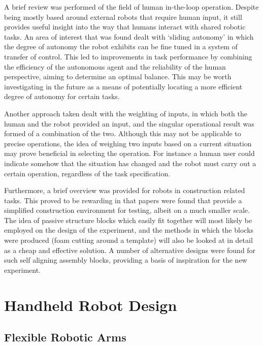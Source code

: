 \documentclass[11pt]{article}
\begin{document}
A brief review was performed of the field of human in-the-loop operation. Despite being mostly based around external robots that require human input, it still provides useful insight into the way that humans interact with shared robotic tasks. An area of interest that was found dealt with `sliding autonomy' in which the degree of autonomy the robot exhibits can be fine tuned in a system of transfer of control. This led to improvements in task performance by combining the efficiency of the autonomous agent and the reliability of the human perspective, aiming to determine an optimal balance. This may be worth investigating in the future as a means of potentially locating a more efficient degree of autonomy for certain tasks. 

Another approach taken dealt with the weighting of inputs, in which both the human and the robot provided an input, and the singular operational result was formed of a combination of the two. Although this may not be applicable to precise operations, the idea of weighing two inputs based on a current situation may prove beneficial in selecting the operation. For instance a human user could indicate somehow that the situation has changed and the robot must carry out a certain operation, regardless of the task specification.

Furthermore, a brief overview was provided for robots in construction related tasks. This proved to be rewarding in that papers were found that provide a simplified construction environment for testing, albeit on a much smaller scale. The idea of passive structure blocks which easily fit together will most likely be employed on the design of the experiment, and the methods in which the blocks were produced (foam cutting around a template) will also be looked at in detail as a cheap and effective solution. A number of alternative designs were found for such self aligning assembly blocks, providing a basis of inspiration for the new experiment.


\pagebreak
\pagebreak

\section{Handheld Robot Design}
\subsection{Flexible Robotic Arms}
\end{document}
